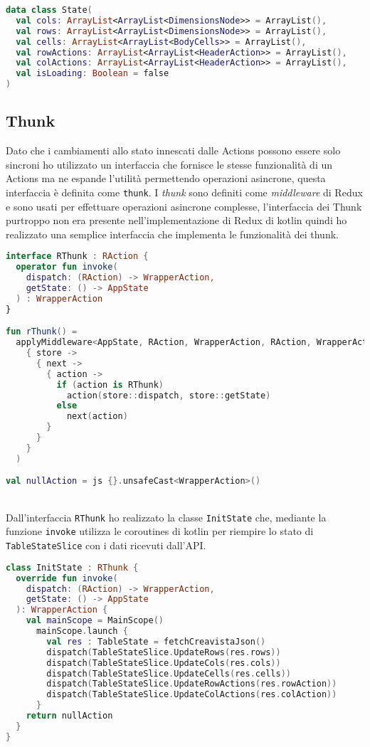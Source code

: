 \begin{lstlisting}[caption={State}, label={lst:bodycells}, language=Kotlin]
data class State(
  val cols: ArrayList<ArrayList<DimensionsNode>> = ArrayList(),
  val rows: ArrayList<ArrayList<DimensionsNode>> = ArrayList(),
  val cells: ArrayList<ArrayList<BodyCells>> = ArrayList(),
  val rowActions: ArrayList<ArrayList<HeaderAction>> = ArrayList(),
  val colActions: ArrayList<ArrayList<HeaderAction>> = ArrayList(),
  val isLoading: Boolean = false
)
\end{lstlisting}

\subsection{Thunk}
Dato che i cambiamenti allo stato innescati dalle Actions possono essere solo sincroni ho utilizzato un interfaccia che fornisce le stesse funzionalità di un Actions ma ne espande l'utilità permettendo operazioni asincrone, questa interfaccia è definita come \verb|thunk|.
I \emph{thunk} sono definiti come \emph{middleware} di Redux e sono usati per effettuare operazioni asincrone complesse, l'interfaccia dei Thunk purtroppo non era presente nell'implementazione di Redux di kotlin quindi ho realizzato una semplice interfaccia che implementa le funzionalità dei thunk.
\begin{lstlisting}[caption={Interfaccia Thunk}, label={lst:bodycells}, language=Kotlin]
interface RThunk : RAction {
  operator fun invoke(
	dispatch: (RAction) -> WrapperAction,
	getState: () -> AppState
  ) : WrapperAction
}

fun rThunk() =
  applyMiddleware<AppState, RAction, WrapperAction, RAction, WrapperAction>(
	{ store ->
	  { next ->
	    { action ->
		  if (action is RThunk)
			action(store::dispatch, store::getState)
		  else
			next(action)
		}
	  }
	}
  )

val nullAction = js {}.unsafeCast<WrapperAction>()
\end{lstlisting}
\noindent \\
Dall'interfaccia \verb|RThunk| ho realizzato la classe \verb|InitState| che, mediante la funzione \verb|invoke| utilizza le coroutines di kotlin per riempire lo stato di \verb|TableStateSlice| con i dati ricevuti dall'API.
\begin{lstlisting}[caption={InitState}, label={lst:bodycells}, language=Kotlin]
class InitState : RThunk {
  override fun invoke(
    dispatch: (RAction) -> WrapperAction, 
    getState: () -> AppState
  ): WrapperAction {
    val mainScope = MainScope()
      mainScope.launch {
        val res : TableState = fetchCreavistaJson()
        dispatch(TableStateSlice.UpdateRows(res.rows))
        dispatch(TableStateSlice.UpdateCols(res.cols))
        dispatch(TableStateSlice.UpdateCells(res.cells))
        dispatch(TableStateSlice.UpdateRowActions(res.rowAction))
        dispatch(TableStateSlice.UpdateColActions(res.colAction))
      }
    return nullAction
  }
}
\end{lstlisting}

